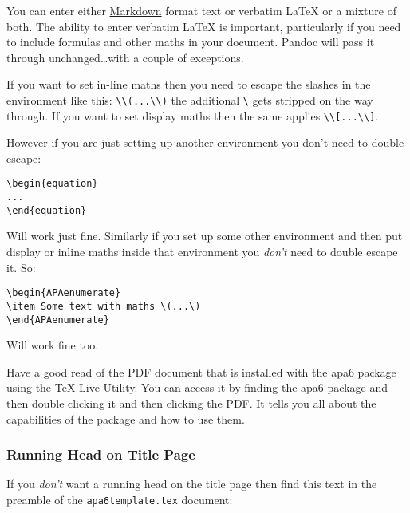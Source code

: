 \documentclass{easychair}
\begin{document}
You can enter either
\href{http://code.ahren.org/markdown-cheatsheet}{Markdown} format text
or verbatim LaTeX or a mixture of both. The ability to enter verbatim
LaTeX is important, particularly if you need to include formulas and
other maths in your document. Pandoc will pass it through
unchanged\ldots{}with a couple of exceptions.

If you want to set in-line maths then you need to escape the slashes in
the environment like this:
\texttt{\textbackslash{}\textbackslash{}(...\textbackslash{}\textbackslash{})}
the additional \texttt{\textbackslash{}} gets stripped on the way
through. If you want to set display maths then the same applies
\texttt{\textbackslash{}\textbackslash{}{[}...\textbackslash{}\textbackslash{}{]}}.

However if you are just setting up another environment you don't need to
double escape:

\begin{verbatim}
\begin{equation}
...
\end{equation}
\end{verbatim}

Will work just fine. Similarly if you set up some other environment and
then put display or inline maths inside that environment you
\emph{don't} need to double escape it. So:

\begin{verbatim}
\begin{APAenumerate}
\item Some text with maths \(...\)
\end{APAenumerate}
\end{verbatim}

Will work fine too.

Have a good read of the PDF document that is installed with the apa6
package using the TeX Live Utility. You can access it by finding the
apa6 package and then double clicking it and then clicking the PDF. It
tells you all about the capabilities of the package and how to use them.

\subsubsection{Running Head on Title
Page}\label{running-head-on-title-page}

If you \emph{don't} want a running head on the title page then find this
text in the preamble of the \texttt{apa6template.tex} document:
\end{document}
